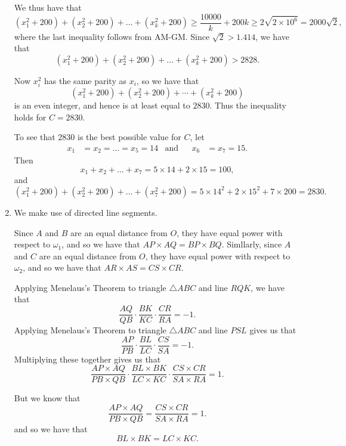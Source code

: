 \documentclass[12pt]{article}
\begin{document}
\begin{enumerate}
We thus have that
\[
    (x_1^2 + 200) + (x_2^2 + 200) + \dots + (x_k^2 + 200) \geq \frac{10000}{k} +
    200k \geq 2 \sqrt{2 \times 10^6} = 2000 \sqrt{2},
\]
where the last inequality follows from AM-GM. Since $\sqrt{2} > 1.414$, we have
that
\[
    (x_1^2 + 200) + (x_2^2 + 200) + \dots + (x_k^2 + 200) > 2828.
\]

Now $x_i^2$ has the same parity as $x_i$, so we have that
\[
    (x_1^2 + 200) + (x_2^2 + 200) + \cdots + (x_k^2 + 200)  
\]
is an even integer, and hence is at least equal to $2830$. Thus the inequality
holds for $C = 2830$.

To see that $2830$ is the best possible value for $C$, let
\begin{align*}
    x_1 & = x_2 = \dots = x_5 = 14 & \text{and} && x_6 & = x_7 = 15.
\end{align*}
Then 
\[
    x_1 + x_2 + \dots + x_7 = 5 \times 14 + 2 \times 15 = 100,
\]
and
\[
    (x_1^2 + 200) + (x_2^2 + 200) + \dots + (x_7^2 + 200) = 5 \times 14^2 + 2
    \times 15^2 + 7 \times 200 = 2830.
\]


\item %
We make use of directed line segments.

Since $A$ and $B$ are an equal distance from $O$, they have equal power with
respect to $\omega_1$, and so we have that $AP \times AQ = BP \times BQ$.
Simllarly, since $A$ and $C$ are an equal distance from $O$, they have equal
power with respect to $\omega_2$, and so we have that $AR \times AS = CS \times
CR$.

Applying Menelaus's Theorem to triangle $\triangle ABC$ and line $RQK$, we have
that
\[
    \frac{AQ}{QB} \cdot \frac{BK}{KC} \cdot \frac{CR}{RA} = -1.
\]
Applying Menelaus's Theorem to triangle $\triangle ABC$ and line $PSL$ gives us
that
\[
    \frac{AP}{PB} \cdot \frac{BL}{LC} \cdot \frac{CS}{SA} = -1.
\]
Multiplying these together gives us that
\[
    \frac{AP \times AQ}{PB \times QB} \cdot \frac{BL \times BK}{LC \times KC}
    \cdot \frac{CS \times CR}{SA \times RA} = 1.
\]

But we know that
\[
    \frac{AP \times AQ}{PB \times QB} = \frac{CS \times CR}{SA \times RA} = 1.
\]
and so we have that
\[
    BL \times BK = LC \times KC.
\]


\end{enumerate}
\end{document}
